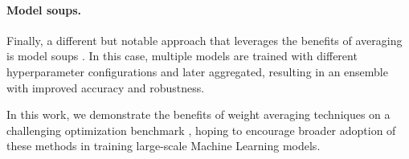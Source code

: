 \vspace{-2mm}
\paragraph{Model soups.} Finally, a different but notable approach that leverages the benefits of averaging is model soups \citep{wortsman_model_2022}. In this case, multiple models are trained with different hyperparameter configurations and later aggregated, resulting in an ensemble with improved accuracy and robustness.

In this work, we demonstrate the benefits of weight averaging techniques on a challenging optimization benchmark \citep{dahl_benchmarking_2023}, hoping to encourage broader adoption of these methods in training large-scale Machine Learning models.



